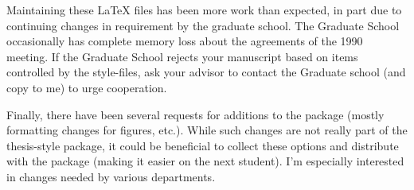 \documentclass[12pt]{report}
\begin{document}
\begin{singlespace}
Maintaining these \LaTeX{} files has been more work than expected, in
part due to continuing changes in requirement by the graduate school.
The Graduate School occasionally has complete memory loss about the
agreements of the 1990 meeting. If the Graduate School rejects your
manuscript based on items controlled by the style-files, ask
your advisor to contact the Graduate school (and copy to me) to urge
cooperation.

Finally, there have been several requests for additions to the package
(mostly formatting changes for figures, etc.). While such changes are not
really part of the thesis-style package, it could be beneficial to collect
these options and distribute with the package (making it easier on the next
student).  I'm especially interested in changes needed by various
departments.

\end{singlespace}
\end{document}
